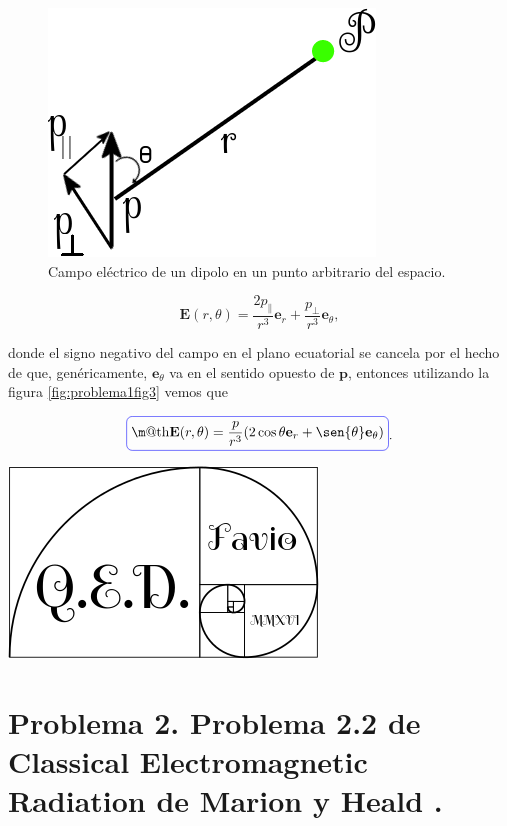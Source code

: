 \documentclass[a4paper,11pt]{article}
\makeatletter
\numberwithin{equation}{section}
\newcommand*{\boxcolor}{blue}
\renewcommand{\boxed}[1]{\textcolor{\boxcolor}{%
\tikz[baseline={([yshift=-1ex]current bounding box.center)}] \node [rectangle, minimum width=1ex,rounded corners,draw] {\normalcolor\m@th$\displaystyle#1$};}}
\makeatother
\begin{document}
\begin{figure}[H]
 \center 
 \includegraphics[scale=0.5]{problema1fig3}
 \caption{Campo eléctrico de un dipolo en un punto arbitrario del espacio.}
 \label{fig:problema1fig3}
\end{figure}

\begin{equation}
 \mathbf{E}(r,\theta) = \frac{2p_\parallel}{r^3} \mathbf{e}_r + 
 \frac{p_\bot}{r^3}\mathbf{e}_\theta,
\end{equation}

donde el signo negativo del campo en el plano ecuatorial se cancela por el hecho de 
que, genéricamente, $\mathbf{e}_\theta$ va en el sentido opuesto de $\mathbf{p}$, 
entonces utilizando la figura \eqref{fig:problema1fig3} vemos que 

\begin{equation}
 \boxed{\mathbf{E}(r,\theta) = \frac{p}{r^3}(2\cos{\theta}\mathbf{e}_r + 
 \sen{\theta}\mathbf{e}_\theta)}.
\end{equation}

\hspace{10cm}\includegraphics[scale=0.25]{logoQED}

\newpage

\section{Problema 2. Problema 2.2 de Classical Electromagnetic Radiation
de Marion y Heald \cite{marion2}.}
\end{document}
